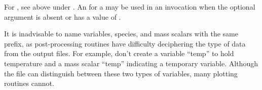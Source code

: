\begin{itemize}
For , see above under .
An  for a  may be used in an
  invocation when the optional 
argument is absent or has a value of .

\begin{flashtip}
It is inadvisable to name variables, species, and mass scalars with the same prefix,
as post-processing routines have difficulty deciphering the type of data from the 
output files.  For example, don't create a variable ``temp'' to hold
temperature and a mass scalar ``temp'' indicating a temporary variable.
Although the  file can distinguish between these two types of variables, many plotting routines cannot.
\end{flashtip} 


\end{itemize}
